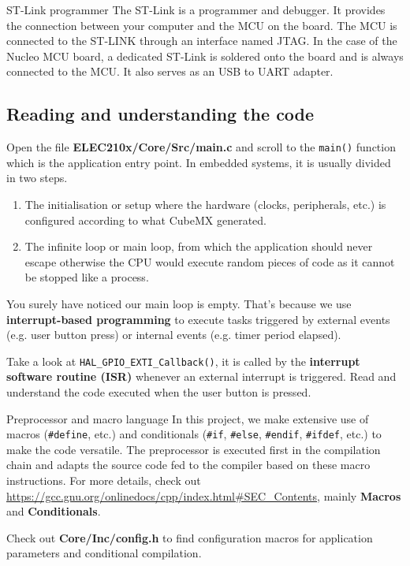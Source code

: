 \begin{bclogo}[couleur = gray!20, arrondi = 0.2, logo=\bcinfo]{ST-Link programmer}
The ST-Link is a programmer and debugger. It provides the connection between your computer and the MCU on the board. The MCU is connected to the ST-LINK through an interface named JTAG. In the case of the Nucleo MCU board, a dedicated ST-Link is soldered onto the board and is always connected to the MCU. It also serves as an USB to UART adapter.
\end{bclogo}

\subsection{Reading and understanding the code}

Open the file \textbf{ELEC210x/Core/Src/main.c} and scroll to the \texttt{main()} function which is the application entry point. In embedded systems, it is usually divided in two steps.
\begin{enumerate}
    \item{The initialisation} or setup where the hardware (clocks, peripherals, etc.) is configured according to what CubeMX generated.
    \item{The infinite loop} or main loop, from which the application should never escape otherwise the CPU would execute random pieces of code as it cannot be stopped like a process.
\end{enumerate}

You surely have noticed our main loop is empty. That's because we use \textbf{interrupt-based programming} to execute tasks triggered by external events (e.g. user button press) or internal events (e.g. timer period elapsed).

Take a look at \texttt{HAL\_GPIO\_EXTI\_Callback()}, it is called by the \textbf{interrupt software routine (ISR)} whenever an external interrupt is triggered. Read and understand the code executed when the user button is pressed.

\begin{bclogo}[couleur = gray!20, arrondi = 0.2, logo=\bcinfo]{Preprocessor and macro language}
In this project, we make extensive use of macros (\texttt{\#define}, etc.) and conditionals (\texttt{\#if}, \texttt{\#else}, \texttt{\#endif}, \texttt{\#ifdef}, etc.) to make the code versatile. The preprocessor is executed first in the compilation chain and adapts the source code fed to the compiler based on these macro instructions. For more details, check out \url{https://gcc.gnu.org/onlinedocs/cpp/index.html#SEC_Contents}, mainly \textbf{Macros} and \textbf{Conditionals}.

Check out \textbf{Core/Inc/config.h} to find configuration macros for application parameters and conditional compilation.
\end{bclogo}


